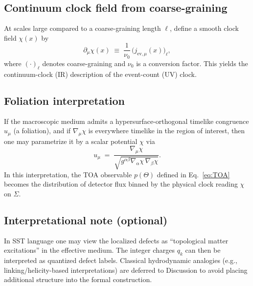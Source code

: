 \documentclass[pdflatex,sn-mathphys-num]{sn-jnl}
\theoremstyle{thmstylethree}
\theoremstyle{thmstyleone}
\theoremstyle{thmstyletwo}
\numberwithin{equation}{section}
\begin{document}
    \subsection{Continuum clock field from coarse-graining}
        
        At scales large compared to a coarse-graining length $\ell$, define a smooth clock field $\chi(x)$ by
        \begin{equation}
            \partial_\mu \chi(x)
            \;\equiv\;
            \frac{1}{\nu_0}\,\big(j_{\mathrm{ev},\mu}(x)\big)_\ell,
            \label{eq:chiFromEvents}
        \end{equation}
        where $(\cdot)_\ell$ denotes coarse-graining and $\nu_0$ is a conversion factor. This yields the continuum-clock (IR) description of the event-count (UV) clock.
    
    \subsection{Foliation interpretation}
        
        If the macroscopic medium admits a hypersurface-orthogonal timelike congruence $u_\mu$ (a foliation), and if $\nabla_\mu\chi$ is everywhere timelike in the region of interest, then one may parametrize it by a scalar potential $\chi$ via
        \begin{equation}
            u_\mu \;=\;\frac{\nabla_\mu \chi}{\sqrt{g^{\alpha\beta}\nabla_\alpha \chi\,\nabla_\beta \chi}}.
            \label{eq:uFromChi}
        \end{equation}
        In this interpretation, the TOA observable $p(\Theta)$ defined in Eq.~\eqref{eq:TOA} becomes the distribution of detector flux binned by the physical clock reading $\chi$ on $\Sigma$.
    
    \subsection{Interpretational note (optional)}
        
        In SST language one may view the localized defects as ``topological matter excitations'' in the effective medium. The integer charges $q_k$ can then be interpreted as quantized defect labels. Classical hydrodynamic analogies (e.g., linking/helicity-based interpretations) are deferred to Discussion to avoid placing additional structure into the formal construction.

\end{document}
